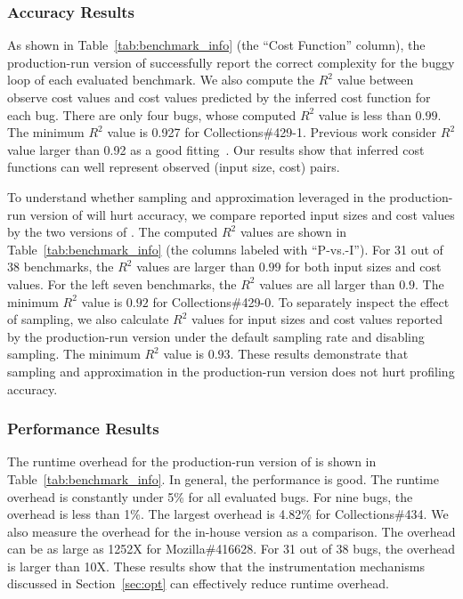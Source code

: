 \subsubsection{Accuracy Results}
As shown in Table~\ref{tab:benchmark_info} (the ``Cost Function'' column),
the production-run version of \Tool successfully 
report the correct complexity for the buggy loop of 
each evaluated benchmark. 
We also compute the $R^2$ value between observe cost values and 
cost values predicted by the inferred cost function for each bug.  
There are only four bugs, whose computed $R^2$ value is less than $0.99$.
The minimum $R^2$ value is 0.927 for Collections\#429-1. 
Previous work consider $R^2$ value larger than 0.92 
as a good fitting~\cite{rsquare-value}.
Our results show that inferred cost functions can well represent 
observed (input size, cost) pairs. 

To understand whether sampling and approximation leveraged 
in the production-run version of \Tool will hurt accuracy, 
we compare reported input sizes and cost values by the two versions of \Tool.
The computed $R^2$ values are shown in Table~\ref{tab:benchmark_info} 
(the columns labeled with ``P-vs.-I''). 
For 31 out of 38 benchmarks, 
the $R^2$ values are larger than $0.99$ for both input sizes and cost values. 
For the left seven benchmarks, the $R^2$ values are all larger than $0.9$.
The minimum $R^2$ value is $0.92$ for Collections\#429-0. 
To separately inspect the effect of sampling, 
we also calculate $R^2$ values for input sizes and cost values reported 
by the production-run version under the default sampling rate and disabling sampling. 
The minimum $R^2$ value is $0.93$. 
These results demonstrate that sampling and approximation in the production-run 
version does not hurt profiling accuracy. 


\subsubsection{Performance Results}
The runtime overhead for the production-run version of \Tool is 
shown in Table~\ref{tab:benchmark_info}. 
In general, the performance is good. The runtime overhead is constantly 
under 5\% for all evaluated bugs. 
For nine bugs, the overhead is less than 1\%. 
The largest overhead is 4.82\% for Collections\#434. 
We also measure the overhead for the in-house version as a comparison. 
The overhead can be as large as 1252X for Mozilla\#416628.
For 31 out of 38 bugs, the overhead is larger than 10X. 
These results show that the instrumentation mechanisms 
discussed in Section~\ref{sec:opt} can effectively reduce runtime overhead. 

